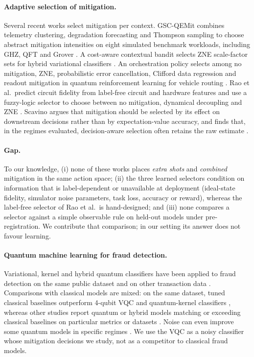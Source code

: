 \documentclass[11pt]{article}
\begin{document}
\paragraph{Adaptive selection of mitigation.}
Several recent works select mitigation per context.
GSC-QEMit combines telemetry clustering, degradation forecasting and Thompson sampling to choose abstract mitigation intensities on eight simulated benchmark workloads, including GHZ, QFT and Grover \citep{szachara2026gsc}.
A cost-aware contextual bandit selects ZNE scale-factor sets for hybrid variational classifiers \citep{rahman2026adaptive}.
An orchestration policy selects among no mitigation, ZNE, probabilistic error cancellation, Clifford data regression and readout mitigation in quantum reinforcement learning for vehicle routing \citep{majid2026context}.
Rao et al.\ predict circuit fidelity from label-free circuit and hardware features and use a fuzzy-logic selector to choose between no mitigation, dynamical decoupling and ZNE \citep{rao2026adaptive}.
Scavino argues that mitigation should be selected by its effect on downstream decisions rather than by expectation-value accuracy, and finds that, in the regimes evaluated, decision-aware selection often retains the raw estimate \citep{scavino2026decision}.

\paragraph{Gap.}
To our knowledge, (i) none of these works places \emph{extra shots} and \emph{combined} mitigation in the same action space; (ii) the three learned selectors condition on information that is label-dependent or unavailable at deployment (ideal-state fidelity, simulator noise parameters, task loss, accuracy or reward), whereas the label-free selector of Rao et al.\ is hand-designed; and (iii) none compares a selector against a simple observable rule on held-out models under pre-registration.
We contribute that comparison; in our setting its answer does not favour learning.

\paragraph{Quantum machine learning for fraud detection.}
Variational, kernel and hybrid quantum classifiers have been applied to fraud detection on the same public dataset and on other transaction data \citep{elalami2026comparative,das2025qfdnn,tudisco2024evaluating,li2025hqrnn,kyriienko2022unsupervised}.
Comparisons with classical models are mixed: on the same dataset, tuned classical baselines outperform 4-qubit VQC and quantum-kernel classifiers \citep{dinut2026comparative}, whereas other studies report quantum or hybrid models matching or exceeding classical baselines on particular metrics or datasets \citep{kyriienko2022unsupervised,li2025hqrnn,tudisco2024evaluating}.
Noise can even improve some quantum models in specific regimes \citep{zhu2026rethinking,ahmed2025noisy}.
We use the VQC as a noisy classifier whose mitigation decisions we study, not as a competitor to classical fraud models.
\end{document}
